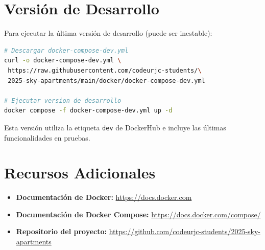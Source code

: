 \section{Versión de Desarrollo}
Para ejecutar la última versión de desarrollo (puede ser inestable):
\begin{lstlisting}[language=bash, basicstyle=\ttfamily\small]
# Descargar docker-compose-dev.yml
curl -o docker-compose-dev.yml \
 https://raw.githubusercontent.com/codeurjc-students/\
 2025-sky-apartments/main/docker/docker-compose-dev.yml

# Ejecutar version de desarrollo
docker compose -f docker-compose-dev.yml up -d
\end{lstlisting}
Esta versión utiliza la etiqueta \texttt{dev} de DockerHub e incluye las últimas funcionalidades en pruebas.

\section{Recursos Adicionales}
\begin{itemize}
    \item \textbf{Documentación de Docker:} \url{https://docs.docker.com}
    \item \textbf{Documentación de Docker Compose:} \url{https://docs.docker.com/compose/}
    \item \textbf{Repositorio del proyecto:} \url{https://github.com/codeurjc-students/2025-sky-apartments}
\end{itemize}